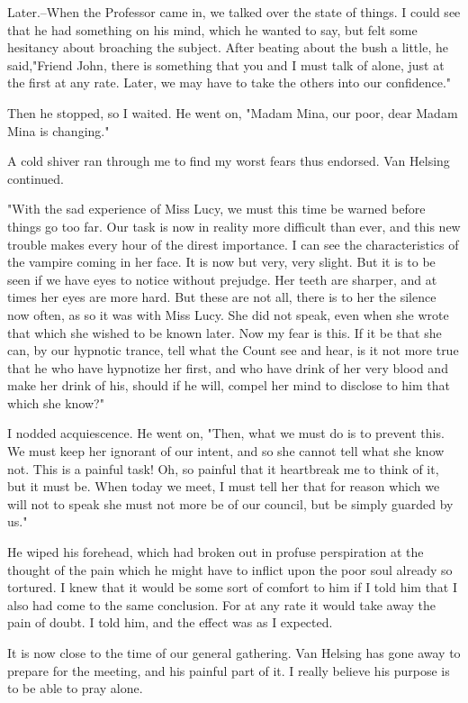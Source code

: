 Later.--When the Professor came in, we talked over the state of things. I could see that he had something on his mind, which he wanted to say, but felt some hesitancy about broaching the subject. After beating about the bush a little, he said,"Friend John, there is something that you and I must talk of alone, just at the first at any rate. Later, we may have to take the others into our confidence." 

Then he stopped, so I waited. He went on, "Madam Mina, our poor, dear Madam Mina is changing." 

A cold shiver ran through me to find my worst fears thus endorsed. Van Helsing continued. 

"With the sad experience of Miss Lucy, we must this time be warned before things go too far. Our task is now in reality more difficult than ever, and this new trouble makes every hour of the direst importance. I can see the characteristics of the vampire coming in her face. It is now but very, very slight. But it is to be seen if we have eyes to notice without prejudge. Her teeth are sharper, and at times her eyes are more hard. But these are not all, there is to her the silence now often, as so it was with Miss Lucy. She did not speak, even when she wrote that which she wished to be known later. Now my fear is this. If it be that she can, by our hypnotic trance, tell what the Count see and hear, is it not more true that he who have hypnotize her first, and who have drink of her very blood and make her drink of his, should if he will, compel her mind to disclose to him that which she know?" 

I nodded acquiescence. He went on, "Then, what we must do is to prevent this. We must keep her ignorant of our intent, and so she cannot tell what she know not. This is a painful task! Oh, so painful that it heartbreak me to think of it, but it must be. When today we meet, I must tell her that for reason which we will not to speak she must not more be of our council, but be simply guarded by us." 

He wiped his forehead, which had broken out in profuse perspiration at the thought of the pain which he might have to inflict upon the poor soul already so tortured. I knew that it would be some sort of comfort to him if I told him that I also had come to the same conclusion. For at any rate it would take away the pain of doubt. I told him, and the effect was as I expected. 

It is now close to the time of our general gathering. Van Helsing has gone away to prepare for the meeting, and his painful part of it. I really believe his purpose is to be able to pray alone. 

